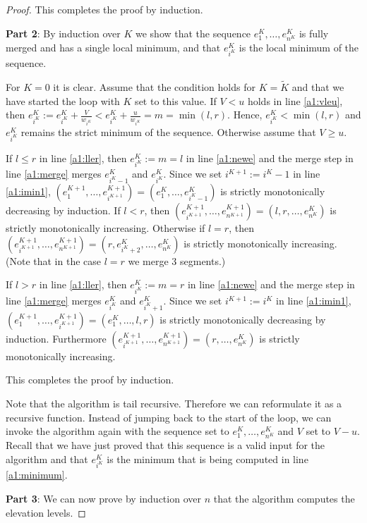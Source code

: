 \documentclass[11pt,a4paper]{article}
\begin{document}
\begin{proof}
This completes the proof by induction.

\textbf{Part 2}: By induction over $K$ we show that the sequence $e_1^K,\ldots,e_{n^K}^K$ is fully merged and has a single local minimum, and that $e_{i^K}^K$ is the local minimum of the sequence.

For $K=0$ it is clear.
Assume that the condition holds for $K = \tilde{K}$ and that we have started the loop with $K$ set to this value.
If $V < u$ holds in line \ref{a1:vleu}, then $e_{i^K}^K := e_{i^K}^K + \frac{V}{w_{i^K}} < e_{i^K}^K + \frac{u}{w_{i^K}} = m = \min(l, r)$.
Hence, $e_{i^K}^K < \min(l, r)$ and $e_{i^K}^K$ remains the strict minimum of the sequence.
Otherwise assume that $V \ge u$.

If $l \le r$ in line \ref{a1:ller}, then $e_{i^K}^K := m = l$ in line \ref{a1:newe} and the merge step in line \ref{a1:merge} merges $e_{i^K - 1}^K$ and $e_{i^K}^K$.
Since we set $i^{K+1} := i^K - 1$ in line \ref{a1:imin1},
$(e_1^{K+1},\ldots,e_{i^{K+1}}^{K+1}) = (e_1^K,\ldots,e_{i^K - 1}^K)$ is strictly monotonically decreasing by induction.
If $l < r$, then $(e_{i^{K+1}}^{K+1},\ldots,e_{n^{K+1}}^{K+1}) = (l,r,\ldots,e_{n^K}^K)$ is strictly monotonically increasing.
Otherwise if $l = r$, then $(e_{i^{K+1}}^{K+1},\ldots,e_{n^{K+1}}^{K+1}) = (r,e_{i^K+2}^K,\ldots,e_{n^K}^K)$ is strictly monotonically increasing.
(Note that in the case $l = r$ we merge 3 segments.)

If $l > r$ in line \ref{a1:ller}, then $e_{i^K}^K := m = r$ in line \ref{a1:newe} and the merge step in line \ref{a1:merge} merges $e_{i^K}^K$ and $e_{i^K + 1}^K$.
Since we set $i^{K+1} := i^K$ in line \ref{a1:imin1},
$(e_1^{K+1},\ldots,e_{i^{K+1}}^{K+1}) = (e_1^K,\ldots,l,r)$ is strictly monotonically decreasing by induction.
Furthermore $(e_{i^{K+1}}^{K+1},\ldots,e_{n^{K+1}}^{K+1}) = (r,\ldots,e_{n^K}^K)$ is strictly monotonically increasing.

This completes the proof by induction.

Note that the algorithm is tail recursive.
Therefore we can reformulate it as a recursive function.
Instead of jumping back to the start of the loop, we can invoke the algorithm again with
the sequence set to $e_1^K,\ldots,e_{n^K}^K$ and $V$ set to $V - u$.
Recall that we have just proved that this sequence is a valid input for the algorithm and that $e_{i^K}^K$ is the minimum that is being computed in line \ref{a1:minimum}.

\textbf{Part 3}: We can now prove by induction over $n$ that the algorithm computes the elevation levels.


\end{proof}
\end{document}
